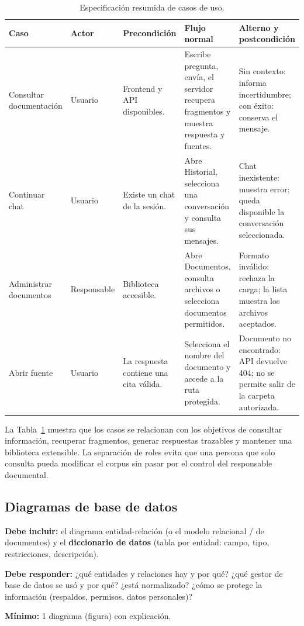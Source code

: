 \begin{table}[H]
\centering\small
\caption{Especificación resumida de casos de uso.}
\label{tab:casos_uso}
\begin{tabular}{p{}p{}p{}p{}p{}}
\toprule
\textbf{Caso} & \textbf{Actor} & \textbf{Precondición} & \textbf{Flujo normal} & \textbf{Alterno y postcondición}\\
\midrule
Consultar documentación & Usuario & Frontend y API disponibles. & Escribe pregunta, envía, el servidor recupera fragmentos y muestra respuesta y fuentes. & Sin contexto: informa incertidumbre; con éxito: conserva el mensaje.\\
Continuar chat & Usuario & Existe un chat de la sesión. & Abre Historial, selecciona una conversación y consulta sus mensajes. & Chat inexistente: muestra error; queda disponible la conversación seleccionada.\\
Administrar documentos & Responsable & Biblioteca accesible. & Abre Documentos, consulta archivos o selecciona documentos permitidos. & Formato inválido: rechaza la carga; la lista muestra los archivos aceptados.\\
Abrir fuente & Usuario & La respuesta contiene una cita válida. & Selecciona el nombre del documento y accede a la ruta protegida. & Documento no encontrado: API devuelve 404; no se permite salir de la carpeta autorizada.\\
\bottomrule
\end{tabular}
\end{table}

La Tabla~\ref{tab:casos_uso} muestra que los casos se relacionan con los objetivos de consultar información, recuperar
fragmentos, generar respuestas trazables y mantener una biblioteca extensible. La separación de roles evita que una
persona que solo consulta pueda modificar el corpus sin pasar por el control del responsable documental.

\subsection{Diagramas de base de datos} \label{sec:diagramas_bd} %

\begin{guia}
\textbf{Debe incluir:} el diagrama entidad-relación (o el modelo relacional / de documentos) y el
\textbf{diccionario de datos} (tabla por entidad: campo, tipo, restricciones, descripción).

\textbf{Debe responder:} ¿qué entidades y relaciones hay y por qué? ¿qué gestor de base de datos se usó y por qué? ¿está
normalizado? ¿cómo se protege la información (respaldos, permisos, datos personales)?

\textbf{Mínimo:} 1 diagrama (figura) con explicación.
\end{guia}

